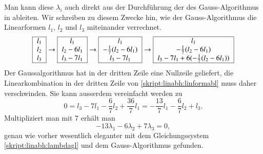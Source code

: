 \begin{beispiel}
Man kann diese $\lambda_i$ auch direkt aus der Durchführung der
des Gauss-Algorithmus in ableiten.
Wir schreiben zu diesem Zwecke hin, wie der Gauss-Algorithmus die
Linearformen $l_1$, $l_2$ und $l_3$ miteinander verrechnet.
\begin{align}
\begin{tabular}{|>{$}c<{$}|}
\hline
l_1\\
l_2\\
l_3\\
\hline
\end{tabular}
\rightarrow
\begin{tabular}{|>{$}c<{$}|}
\hline
l_1\\
l_2-6l_1\\
l_3-7l_1\\
\hline
\end{tabular}
\rightarrow
\begin{tabular}{|>{$}c<{$}|}
\hline
l_1\\
-\frac{1}{7}(l_2-6l_1)\\
l_3-7l_1\\
\hline
\end{tabular}
\rightarrow
\begin{tabular}{|>{$}c<{$}|}
\hline
l_1\\
-\frac{1}{7}(l_2-6l_1)\\
l_3-7l_1+6(-\frac{1}{7}(l_2-6l_1))\\
\hline
\end{tabular}
\label{skript:linabh:linformabl}
\end{align}
Der Gaussalgorithmus hat in der dritten Zeile eine Nullzeile geliefert,
die Linearkombination in der dritten Zeile von
\eqref{skript:linabh:linformabl} muss daher verschwinden.
Sie kann ausserdem vereinfacht werden zu
\[
0=l_3-7l_1-\frac{6}{7}l_2 +\frac{36}{7}l_1
=
-\frac{13}{7}l_1-\frac{6}{7}l_2+l_3.
\]
Multipliziert man mit 7 erhält man
\[
-13\lambda_1-6\lambda_2+7\lambda_3=0,
\]
genau wie vorher wesentlich eleganter mit dem Gleichungssystem
\eqref{skript:linabh:lambdagl} und dem Gauss-Al\-go\-rith\-mus
gefunden.
\end{beispiel}

